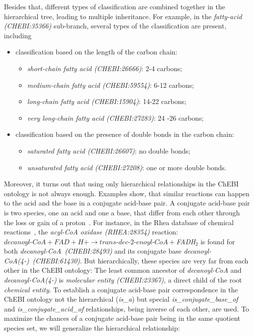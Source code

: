 \documentclass[10pt]{bmc_article}
\newenvironment{bmcformat}{\baselineskip20pt\sloppy\setboolean{publ}{false}}{\baselineskip20pt\sloppy}
\begin{document}
\begin{bmcformat}
Besides that, different types of classification are combined together in the hierarchical tree, leading to multiple inheritance. For example, in the \textit{fatty-acid (CHEBI:35366)} sub-branch, several types of the classification are present, including
\begin{itemize}
\item classification based on the length of the carbon chain:
\begin{itemize}
\item \textit{short-chain fatty acid (CHEBI:26666)}: 2-4 carbons;
\item \textit{medium-chain fatty acid (CHEBI:59554)}: 6-12 carbons;
\item \textit{long-chain fatty acid (CHEBI:15904)}: 14-22 carbons;
\item \textit{very long-chain fatty acid (CHEBI:27283)}: 24 -26 carbons;
\end{itemize}
\item classification based on the presence of double bonds in the carbon chain:
\begin{itemize}
\item \textit{saturated fatty acid (CHEBI:26607)}: no double bonds;
\item \textit{unsaturated fatty acid (CHEBI:27208)}: one or more double bonds.
\end{itemize}
\end{itemize}

Moreover, it turns out that using only hierarchical relationships in the ChEBI ontology is not always enough. Examples show, that similar reactions can happen to the acid and the base in a conjugate acid-base pair. A conjugate acid-base pair is two species, one an acid and one a base, that differ from each other through the loss or gain of a proton~\cite{stoker2012general}. For instance, in the Rhea database of chemical reactions~\cite{Alcantara2012}, the \textit{acyl-CoA oxidase (RHEA:28354)} reaction: $\textit{decanoyl-CoA} + \textit{FAD} + \textit{H+} \rightarrow \textit{trans-dec-2-enoyl-CoA} + $\textit{FADH$_2$} is found for both \textit{decanoyl-CoA~(CHEBI:28493)} and its conjugate base \textit{decanoyl-CoA(4-)~(CHEBI:61430)}. But hierarchically, these species are very far from each other in the ChEBI ontology: The least common ancestor of \textit{decanoyl-CoA} and \textit{decanoyl-CoA(4-)} is \textit{molecular entity (CHEBI:23367)}, a direct child of the root \textit{chemical entity}. To establish a conjugate acid-base pair correspondence in the ChEBI ontology not the hierarchical (\textit{is\_a}) but special \textit{is\_conjugate\_base\_of} and \textit{is\_conjugate\_acid\_of} relationships, being inverse of each other, are used. To maximize the chances of a conjugate acid-base pair being in the same quotient species set, we will generalize the hierarchical relationship:


\end{bmcformat}
\end{document}
